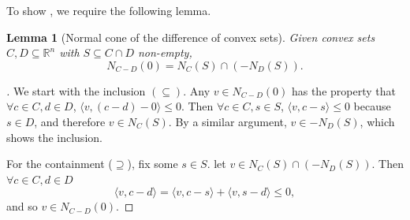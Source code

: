 \documentclass{article}
\theoremstyle{plain}
\newtheorem{lemma}{Lemma}[section]
\theoremstyle{definition}
\theoremstyle{remark}
\begin{document}
To show , we require the following lemma.
\begin{lemma}[Normal cone of the difference of convex sets]
\label{loc:normal_cone_of_the_difference_of_convex_sets.statement}
Given convex sets $C, D \subseteq \mathbb{R}^n$ with $S \subseteq C \cap D$ non-empty,
\begin{equation*}
N_{C-D}(0) = N_C(S)  \cap (- N_D(S)).
\end{equation*}
\end{lemma}
\begin{proof}[\hypertarget{loc:normal_cone_of_the_difference_of_convex_sets.proof}Proof of \Cref{loc:normal_cone_of_the_difference_of_convex_sets.statement}]

We start with the inclusion $( \subseteq )$.
Any $v  \in N_{C-D}(0)$ has the property that $\forall c \in C, d \in D$, $\langle v, (c-d)-0\rangle \le 0$.
Then $\forall c  \in C, s \in S$, $\langle v, c-s\rangle \leq 0$ because $s \in D$, and therefore $v \in N_C(S)$. By a similar argument, $v \in -N_D(S)$, which shows the inclusion.

For the containment ($\supseteq$), fix some $s \in S$.
let $v \in N_{C}(S) \cap (-N_{D}(S))$. Then $\forall c \in C, d \in D$ 
\begin{equation*}
\langle v, c-d\rangle= \langle v, c-s\rangle  + \langle v, s-d\rangle \leq 0,
\end{equation*}
and so $v \in N_{C-D}(0)$.
\end{proof}
\end{document}
